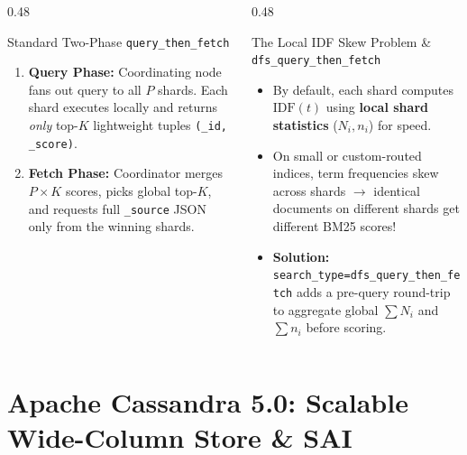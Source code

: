 \documentclass[aspectratio=169]{beamer}
\begin{document}
\begin{frame}
\vspace{0.12cm}
\begin{columns}[T]
\begin{column}{0.48\textwidth}
\begin{block}{\scriptsize Standard Two-Phase \texttt{query\_then\_fetch}}
\scriptsize
\begin{enumerate}
    \item \textbf{Query Phase:} Coordinating node fans out query to all $P$ shards. Each shard executes locally and returns \emph{only} top-$K$ lightweight tuples \texttt{(\_id, \_score)}.
    \item \textbf{Fetch Phase:} Coordinator merges $P \times K$ scores, picks global top-$K$, and requests full \texttt{\_source} JSON only from the winning shards.
\end{enumerate}
\end{block}
\end{column}
\begin{column}{0.48\textwidth}
\begin{alertblock}{\scriptsize The Local IDF Skew Problem \& \texttt{dfs\_query\_then\_fetch}}
\scriptsize
\begin{itemize}
    \item By default, each shard computes $\text{IDF}(t)$ using \textbf{local shard statistics} ($N_i, n_i$) for speed.
    \item On small or custom-routed indices, term frequencies skew across shards $\rightarrow$ identical documents on different shards get different BM25 scores!
    \item \textbf{Solution:} \texttt{search\_type=dfs\_query\_then\_fetch} adds a pre-query round-trip to aggregate global $\sum N_i$ and $\sum n_i$ before scoring.
\end{itemize}
\end{alertblock}
\end{column}
\end{columns}
\end{frame}

\section{Apache Cassandra 5.0: Scalable Wide-Column Store \& SAI}
\end{document}
